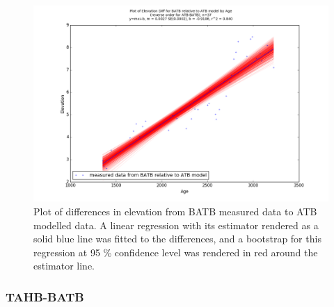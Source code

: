 \begin{figure}[H]
	\includegraphics[width=1.3\linewidth, angle=270 ]{data/bothNonZero/withinSeventyFivePercent/gias/theGIA_BATB_relative_to_ATB.png}
	\caption{Plot of differences in elevation from BATB measured data to ATB modelled data. A linear regression with its estimator rendered as
	 a solid blue line was fitted to the differences, and a bootstrap for this regression at 95 \% confidence level was rendered in red
	 around the estimator line.}
	\label{fig:gias_BATBxATB}
\end{figure}
\newpage













\subsubsection{TAHB-BATB}

